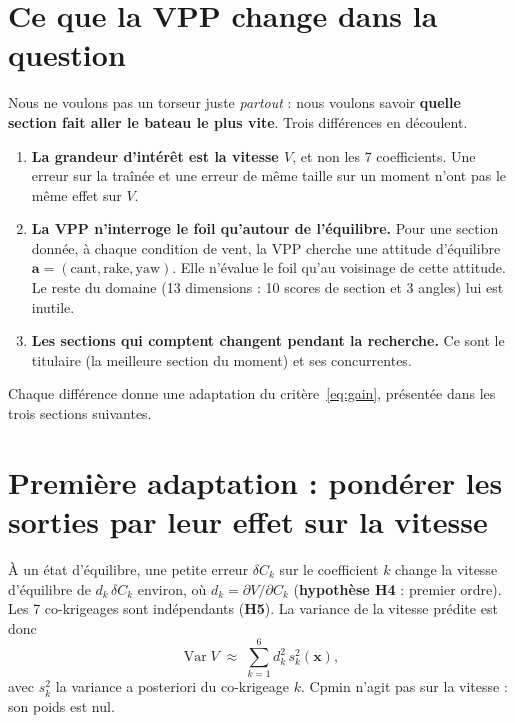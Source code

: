 \documentclass[11pt,a4paper]{article}
\newcommand{\vx}{\bm{x}}
\newcommand{\va}{\bm{a}}
\DeclareMathOperator{\Var}{Var}
\begin{document}
\section{Ce que la VPP change dans la question}
Nous ne voulons pas un torseur juste \emph{partout} : nous voulons savoir \textbf{quelle section fait aller
le bateau le plus vite}. Trois différences en découlent.
\begin{enumerate}
  \item \textbf{La grandeur d'intérêt est la vitesse $V$}, et non les 7 coefficients. Une erreur sur la
        traînée et une erreur de même taille sur un moment n'ont pas le même effet sur $V$.
  \item \textbf{La VPP n'interroge le foil qu'autour de l'équilibre.} Pour une section donnée, à chaque
        condition de vent, la VPP cherche une attitude d'équilibre $\va=(\text{cant},\text{rake},\text{yaw})$.
        Elle n'évalue le foil qu'au voisinage de cette attitude. Le reste du domaine (13 dimensions : 10
        scores de section et 3 angles) lui est inutile.
  \item \textbf{Les sections qui comptent changent pendant la recherche.} Ce sont le titulaire (la meilleure
        section du moment) et ses concurrentes.
\end{enumerate}
Chaque différence donne une adaptation du critère~\eqref{eq:gain}, présentée dans les trois sections suivantes.

\section{Première adaptation : pondérer les sorties par leur effet sur la vitesse}
\begin{theorie}
À un état d'équilibre, une petite erreur $\delta C_k$ sur le coefficient $k$ change la vitesse
d'équilibre de $d_k\,\delta C_k$ environ, où $d_k=\partial V/\partial C_k$ (\textbf{hypothèse H4} :
premier ordre). Les 7 co-krigeages sont indépendants (\textbf{H5}). La variance de la vitesse prédite est
donc
\begin{equation}\label{eq:varV}
  \Var V \;\approx\; \sum_{k=1}^{6} d_k^2\,s_k^2(\vx),
\end{equation}
avec $s_k^2$ la variance a posteriori du co-krigeage $k$. Cpmin n'agit pas sur la vitesse : son poids est
nul.
\end{theorie}
\end{document}
